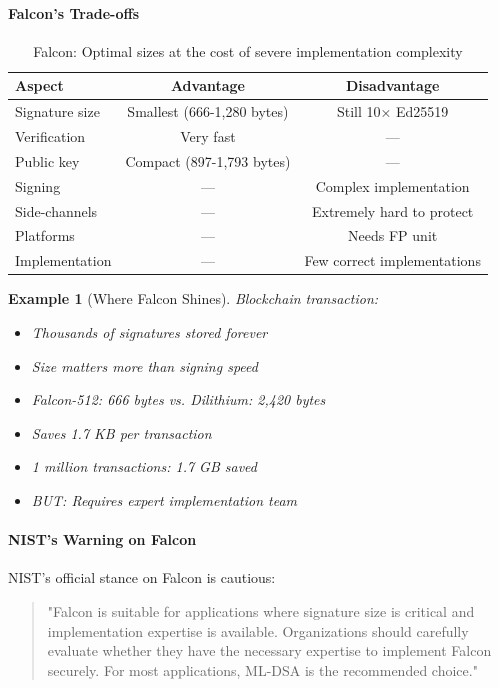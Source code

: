 \documentclass[11pt,a4paper]{article}
\newtheorem{example}{Example}
\begin{document}
\paragraph{Falcon's Trade-offs}

\begin{table}[h]
\centering
\begin{tabular}{|l|c|c|}
\hline
\textbf{Aspect} & \textbf{Advantage} & \textbf{Disadvantage} \\
\hline
Signature size & Smallest (666-1,280 bytes) & Still 10× Ed25519 \\
Verification & Very fast & — \\
Public key & Compact (897-1,793 bytes) & — \\
Signing & — & Complex implementation \\
Side-channels & — & Extremely hard to protect \\
Platforms & — & Needs FP unit \\
Implementation & — & Few correct implementations \\
\hline
\end{tabular}
\caption{Falcon: Optimal sizes at the cost of severe implementation complexity}
\end{table}

\begin{example}[Where Falcon Shines]
Blockchain transaction:
\begin{itemize}
    \item Thousands of signatures stored forever
    \item Size matters more than signing speed
    \item Falcon-512: 666 bytes vs. Dilithium: 2,420 bytes
    \item Saves 1.7 KB per transaction
    \item 1 million transactions: 1.7 GB saved
    \item BUT: Requires expert implementation team
\end{itemize}
\end{example}

\paragraph{NIST's Warning on Falcon}

NIST's official stance on Falcon is cautious:

\begin{quote}
"Falcon is suitable for applications where signature size is critical and implementation expertise is available. Organizations should carefully evaluate whether they have the necessary expertise to implement Falcon securely. For most applications, ML-DSA is the recommended choice."
\end{quote}
\end{document}
